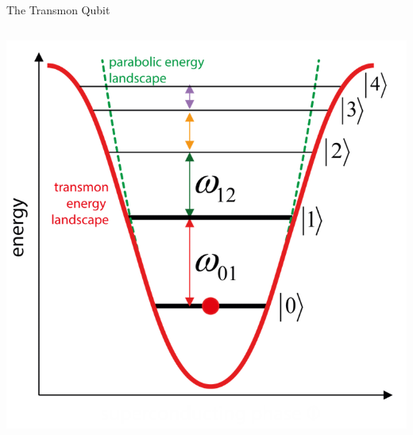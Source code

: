 \begin{frame}{The Transmon Qubit}
\begin{columns}
    \includegraphics[width=\textwidth]{images/energy_spacing_transmon.png}

  \end{columns}
\end{frame}
  

